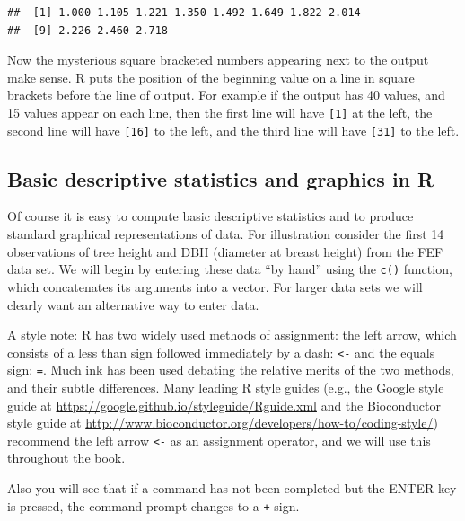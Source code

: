 \documentclass[]{krantz}
\theoremstyle{definition}
\theoremstyle{definition}
\theoremstyle{definition}
\theoremstyle{remark}
\begin{document}
\begin{verbatim}
##  [1] 1.000 1.105 1.221 1.350 1.492 1.649 1.822 2.014
##  [9] 2.226 2.460 2.718
\end{verbatim}

Now the mysterious square bracketed numbers appearing next to the output
make sense. R puts the position of the beginning value on a line in
square brackets before the line of output. For example if the output has
40 values, and 15 values appear on each line, then the first line will
have \texttt{{[}1{]}} at the left, the second line will have
\texttt{{[}16{]}} to the left, and the third line will have
\texttt{{[}31{]}} to the left.

\subsection{Basic descriptive statistics and graphics in
R}\label{sec:dec}

Of course it is easy to compute basic descriptive statistics and to
produce standard graphical representations of data. For illustration
consider the first 14 observations of tree height and DBH (diameter at
breast height) from the FEF data set. We will begin by entering these
data ``by hand'' using the \texttt{c()} function, which concatenates its
arguments into a vector. For larger data sets we will clearly want an
alternative way to enter data.

A style note: R has two widely used methods of assignment: the left
arrow, which consists of a less than sign followed immediately by a
dash: \texttt{\textless{}-} and the equals sign: \texttt{=}. Much ink
has been used debating the relative merits of the two methods, and their
subtle differences. Many leading R style guides (e.g., the Google style
guide at \url{https://google.github.io/styleguide/Rguide.xml} and the
Bioconductor style guide at
\url{http://www.bioconductor.org/developers/how-to/coding-style/})
recommend the left arrow \texttt{\textless{}-} as an assignment
operator, and we will use this throughout the book.

Also you will see that if a command has not been completed but the ENTER
key is pressed, the command prompt changes to a \texttt{+} sign.
\end{document}

